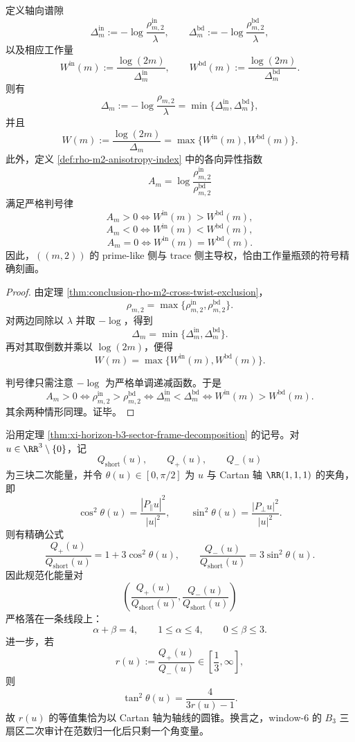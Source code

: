 \begin{corollary}\label{cor:conclusion-rho-m2-workload-max-decomposition}
定义轴向谱隙
\[
\Delta_m^{\mathrm{in}}
:=
-\log\frac{\rho^{\mathrm{in}}_{m,2}}{\lambda},
\qquad
\Delta_m^{\mathrm{bd}}
:=
-\log\frac{\rho^{\mathrm{bd}}_{m,2}}{\lambda},
\]
以及相应工作量
\[
W^{\mathrm{in}}(m):=\frac{\log(2m)}{\Delta_m^{\mathrm{in}}},
\qquad
W^{\mathrm{bd}}(m):=\frac{\log(2m)}{\Delta_m^{\mathrm{bd}}}.
\]
则有
\[
\Delta_m
:=
-\log\frac{\rho_{m,2}}{\lambda}
=
\min\{\Delta_m^{\mathrm{in}},\Delta_m^{\mathrm{bd}}\},
\]
并且
\[
W(m):=\frac{\log(2m)}{\Delta_m}
=
\max\{W^{\mathrm{in}}(m),W^{\mathrm{bd}}(m)\}.
\]
此外，定义 \ref{def:rho-m2-anisotropy-index} 中的各向异性指数
\[
A_m=\log\frac{\rho^{\mathrm{in}}_{m,2}}{\rho^{\mathrm{bd}}_{m,2}}
\]
满足严格判号律
\[
A_m>0 \iff W^{\mathrm{in}}(m)>W^{\mathrm{bd}}(m),
\]
\[
A_m<0 \iff W^{\mathrm{in}}(m)<W^{\mathrm{bd}}(m),
\]
\[
A_m=0 \iff W^{\mathrm{in}}(m)=W^{\mathrm{bd}}(m).
\]
因此，\(((m,2))\) 的 prime-like 侧与 trace 侧主导权，恰由工作量瓶颈的符号精确刻画。
\end{corollary}
\begin{proof}
由定理 \ref{thm:conclusion-rho-m2-cross-twist-exclusion}，
\[
\rho_{m,2}=\max\{\rho^{\mathrm{in}}_{m,2},\rho^{\mathrm{bd}}_{m,2}\}.
\]
对两边同除以 \(\lambda\) 并取 \(-\log\)，得到
\[
\Delta_m=\min\{\Delta_m^{\mathrm{in}},\Delta_m^{\mathrm{bd}}\}.
\]
再对其取倒数并乘以 \(\log(2m)\)，便得
\[
W(m)=\max\{W^{\mathrm{in}}(m),W^{\mathrm{bd}}(m)\}.
\]

判号律只需注意 \(-\log\) 为严格单调递减函数。于是
\[
A_m>0
\iff
\rho^{\mathrm{in}}_{m,2}>\rho^{\mathrm{bd}}_{m,2}
\iff
\Delta_m^{\mathrm{in}}<\Delta_m^{\mathrm{bd}}
\iff
W^{\mathrm{in}}(m)>W^{\mathrm{bd}}(m).
\]
其余两种情形同理。证毕。
\end{proof}
\begin{theorem}\label{thm:conclusion-window6-sector-energy-simplex-cone-tomography}
沿用定理 \ref{thm:xi-horizon-b3-sector-frame-decomposition} 的记号。对 \(u\in \RR^3\setminus\{0\}\)，记
\[
Q_{\mathrm{short}}(u),\qquad Q_+(u),\qquad Q_-(u)
\]
为三块二次能量，并令 \(\theta(u)\in[0,\pi/2]\) 为 \(u\) 与 Cartan 轴 \(\RR(1,1,1)\) 的夹角，即
\[
\cos^2\theta(u)=\frac{|P_{\parallel}u|^2}{|u|^2},
\qquad
\sin^2\theta(u)=\frac{|P_{\perp}u|^2}{|u|^2}.
\]
则有精确公式
\[
\frac{Q_+(u)}{Q_{\mathrm{short}}(u)}=1+3\cos^2\theta(u),
\qquad
\frac{Q_-(u)}{Q_{\mathrm{short}}(u)}=3\sin^2\theta(u).
\]
因此规范化能量对
\[
\left(
\frac{Q_+(u)}{Q_{\mathrm{short}}(u)},
\frac{Q_-(u)}{Q_{\mathrm{short}}(u)}
\right)
\]
严格落在一条线段上：
\[
\alpha+\beta=4,\qquad 1\le \alpha\le 4,\qquad 0\le \beta\le 3.
\]
进一步，若
\[
r(u):=\frac{Q_+(u)}{Q_-(u)}\in\left[\frac13,\infty\right],
\]
则
\[
\tan^2\theta(u)=\frac{4}{3r(u)-1}.
\]
故 \(r(u)\) 的等值集恰为以 Cartan 轴为轴线的圆锥。换言之，window-\(6\) 的 \(B_3\) 三扇区二次审计在范数归一化后只剩一个角变量。
\end{theorem}
